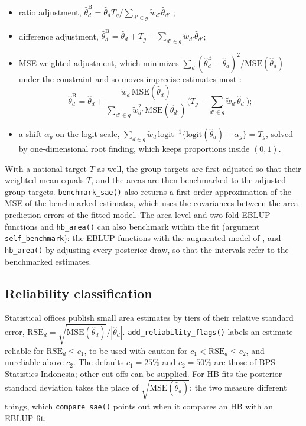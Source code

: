 \begin{itemize}
\tightlist
\item
  ratio adjustment, \(\hat{\theta}^{\mathrm{B}}_d = \hat{\theta}_d T_g / \sum_{d' \in g}\tilde{w}_{d'}\hat{\theta}_{d'}\) \citep{rao2015small};
\item
  difference adjustment, \(\hat{\theta}^{\mathrm{B}}_d = \hat{\theta}_d + T_g - \sum_{d' \in g}\tilde{w}_{d'}\hat{\theta}_{d'}\);
\item
  MSE-weighted adjustment, which minimizes \(\sum_d(\hat{\theta}^{\mathrm{B}}_d - \hat{\theta}_d)^2/\mathrm{MSE}(\hat{\theta}_d)\) under the constraint and so moves imprecise estimates most \citep{datta2011bayesian, bell2013benchmarking}:
  \begin{equation}
  \hat{\theta}^{\mathrm{B}}_d = \hat{\theta}_d + \frac{\tilde{w}_d\,\mathrm{MSE}(\hat{\theta}_d)}{\sum_{d' \in g}\tilde{w}_{d'}^2\,\mathrm{MSE}(\hat{\theta}_{d'})}\Big(T_g - \sum_{d' \in g}\tilde{w}_{d'}\hat{\theta}_{d'}\Big);
  \label{eq:bench-opt}
  \end{equation}
\item
  a shift \(\alpha_g\) on the logit scale, \(\sum_{d \in g}\tilde{w}_d\,\mathrm{logit}^{-1}\{\mathrm{logit}(\hat{\theta}_d) + \alpha_g\} = T_g\), solved by one-dimensional root finding, which keeps proportions inside \((0, 1)\).
\end{itemize}

With a national target \(T\) as well, the group targets are first adjusted so that their weighted mean equals \(T\), and the areas are then benchmarked to the adjusted group targets. \texttt{benchmark\_sae()} also returns a first-order approximation of the MSE of the benchmarked estimates, which uses the covariances between the area prediction errors of the fitted model. The area-level and two-fold EBLUP functions and \texttt{hb\_area()} can also benchmark within the fit (argument \texttt{self\_benchmark}): the EBLUP functions with the augmented model of \citet{wang2008small}, and \texttt{hb\_area()} by adjusting every posterior draw, so that the intervals refer to the benchmarked estimates.

\subsection{Reliability classification}\label{sec:methods-reliability}

Statistical offices publish small area estimates by tiers of their relative standard error, \(\mathrm{RSE}_d = \sqrt{\mathrm{MSE}(\hat{\theta}_d)}/|\hat{\theta}_d|\). \texttt{add\_reliability\_flags()} labels an estimate reliable for \(\mathrm{RSE}_d \le c_1\), to be used with caution for \(c_1 < \mathrm{RSE}_d \le c_2\), and unreliable above \(c_2\). The defaults \(c_1 = 25\%\) and \(c_2 = 50\%\) are those of BPS-Statistics Indonesia; other cut-offs can be supplied. For HB fits the posterior standard deviation takes the place of \(\sqrt{\mathrm{MSE}(\hat{\theta}_d)}\); the two measure different things, which \texttt{compare\_sae()} points out when it compares an HB with an EBLUP fit.

